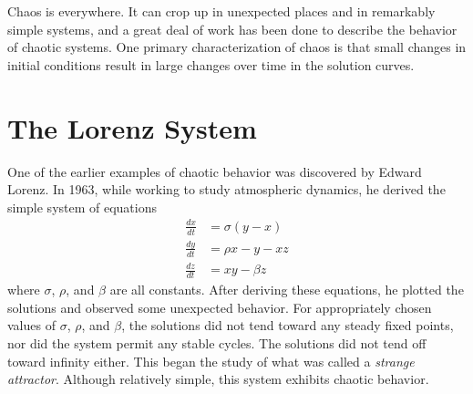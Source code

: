 
Chaos is everywhere.
It can crop up in unexpected places and in remarkably simple systems, and a great deal of work has been done to describe the behavior of chaotic systems.
One primary characterization of chaos is that small changes in initial conditions result in large changes over time in the solution curves.

\section*{The Lorenz System}
One of the earlier examples of chaotic behavior was discovered by Edward Lorenz.
In 1963, while working to study atmospheric dynamics, he derived the simple system of equations
\begin{align*}
\frac{d x}{d t} &= \sigma \left(y - x\right) \\
\frac{d y}{d t} &= \rho x - y - x z \\
\frac{d z}{d t} &= x y - \beta z
\end{align*}
where $\sigma$, $\rho$, and $\beta$ are all constants.
After deriving these equations, he plotted the solutions and observed some unexpected behavior.
For appropriately chosen values of $\sigma$, $\rho$, and $\beta$, the solutions did not tend toward any steady fixed points, nor did the system permit any stable cycles.
The solutions did not tend off toward infinity either.
This began the study of what was called a \textit{strange attractor}.
Although relatively simple, this system exhibits chaotic behavior.

